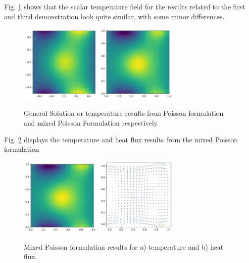 \documentclass[12pt,3p]{article}
\begin{document}
Fig. \ref{FigPoissonTemp} shows that the scalar temperature field for the results related to the first and third demonstration look quite similar, with some minor differences. 
\begin{figure}[!htb]
\centering
\includegraphics[width=0.35\textwidth]{./Images/Poisson//Temperature.pdf}
\includegraphics[width=0.35\textwidth]{./Images/PoissonMixed/Temperature.pdf}
\caption{General Solution or temperature results from Poisson formulation and mixed Poisson Formulation respectively.}
\label{FigPoissonTemp}
\end{figure}

Fig. \ref{FigMixedPoisson} displays the temperature and heat flux results from the mixed Poisson formulation
\begin{figure}[!htb]
\centering
\includegraphics[width=0.35\textwidth]{./Images/PoissonMixed/Temperature.pdf}
\includegraphics[width=0.35\textwidth]{./Images/PoissonMixed/HeatFlux.pdf}
\caption{Mixed Poisson formulation results for a) temperature and b) heat flux.  }
\label{FigMixedPoisson}
\end{figure}
\end{document}
